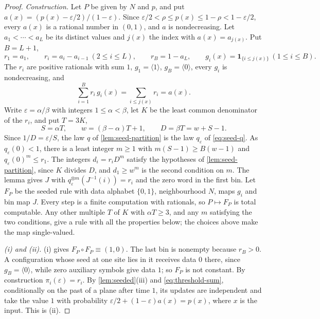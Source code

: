\documentclass[11pt]{article}
\theoremstyle{plain}
\theoremstyle{definition}
\theoremstyle{remark}
\newcommand{\eps}{\varepsilon}
\newcommand{\ind}{\mathbf 1}
\begin{document}
\begin{proof}
\emph{Construction.} Let $P$ be given by $N$ and $p$, and put $a(x)=(p(x)-\eps/2)/(1-\eps)$. Since $\eps/2<\rho\leq p(x)\leq1-\rho<1-\eps/2$, every $a(x)$ is a rational number in $(0,1)$, and $a$ is nondecreasing. Let $a_1<\cdots<a_L$ be its distinct values and $j(x)$ the index with $a(x)=a_{j(x)}$. Put $B=L+1$,
\[
 r_1=a_1,\qquad r_i=a_i-a_{i-1}\ (2\leq i\leq L),\qquad r_B=1-a_L,\qquad
 g_i(x)=\ind_{\{i\leq j(x)\}}\ (1\leq i\leq B).
\]
The $r_i$ are positive rationals with sum $1$, $g_1=\langle1\rangle$, $g_B=\langle0\rangle$, every $g_i$ is nondecreasing, and
\begin{equation}\label{eq:threshold-sum}
 \sum_{i=1}^Br_i\,g_i(x)=\sum_{i\leq j(x)}r_i=a(x).
\end{equation}
Write $\eps=\alpha/\beta$ with integers $1\leq\alpha<\beta$, let $K$ be the least common denominator of the $r_i$, and put $T=3K$,
\[
 S=\alpha T,\qquad w=(\beta-\alpha)T+1,\qquad D=\beta T=w+S-1.
\]
Since $1/D=\eps/S$, the law $q$ of \cref{lem:seed-partition} is the law $q_\eps$ of \eqref{eq:seed-q}. As $q_\eps(0)<1$, there is a least integer $m\geq1$ with $m(S-1)\geq B(w-1)$ and $q_\eps(0)^m\leq r_1$. The integers $d_i=r_iD^m$ satisfy the hypotheses of \cref{lem:seed-partition}, since $K$ divides $D$, and $d_1\geq w^m$ is the second condition on $m$. The lemma gives $J$ with $q_\eps^{\otimes m}(J^{-1}(i))=r_i$ and the zero word in the first bin. Let $F_P$ be the seeded rule with data alphabet $\{0,1\}$, neighbourhood $N$, maps $g_i$ and bin map $J$. Every step is a finite computation with rationals, so $P\mapsto F_P$ is total computable. Any other multiple $T$ of $K$ with $\alpha T\geq3$, and any $m$ satisfying the two conditions, give a rule with all the properties below; the choices above make the map single-valued.

\emph{(i) and (ii).} (i) gives $F_P\circ F_P\equiv(1,0)$. The last bin is nonempty because $r_B>0$. A configuration whose seed at one site lies in it receives data $0$ there, since $g_B=\langle0\rangle$, while zero auxiliary symbols give data $1$; so $F_P$ is not constant. By construction $\pi_i(\eps)=r_i$. By \cref{lem:seeded}(iii) and \eqref{eq:threshold-sum}, conditionally on the past of a plane after time $1$, its updates are independent and take the value $1$ with probability $\eps/2+(1-\eps)a(x)=p(x)$, where $x$ is the input. This is (ii).


\end{proof}
\end{document}
